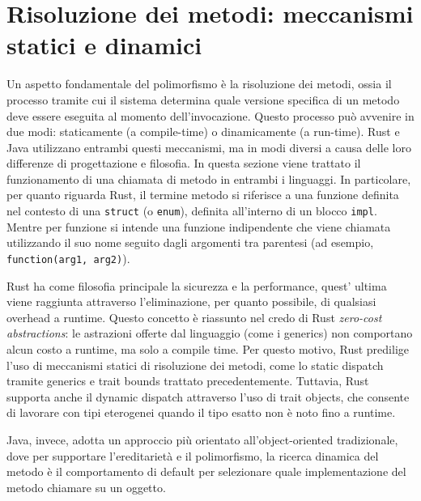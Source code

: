 \section{Risoluzione dei metodi: meccanismi statici e dinamici}
Un aspetto fondamentale del polimorfismo è la risoluzione dei metodi, ossia il processo tramite cui il sistema determina quale versione specifica di un metodo deve essere eseguita al momento dell'invocazione. Questo processo può avvenire in due modi: staticamente (a compile-time) o dinamicamente (a run-time). Rust e Java utilizzano entrambi questi meccanismi, ma in modi diversi a causa delle loro differenze di progettazione e filosofia. In questa sezione viene trattato il funzionamento di una chiamata di metodo in entrambi i linguaggi. In particolare, per quanto riguarda Rust, il termine metodo si riferisce a una funzione definita nel contesto di una \texttt{struct} (o \texttt{enum}), definita all'interno di un blocco \texttt{impl}. Mentre per funzione si intende una funzione indipendente che viene chiamata utilizzando il suo nome seguito dagli argomenti tra parentesi (ad esempio, \texttt{function(arg1, arg2)}).

Rust ha come filosofia principale la sicurezza e la performance, quest' ultima viene raggiunta attraverso l'eliminazione, per quanto possibile, di qualsiasi overhead a runtime. Questo concetto è riassunto nel credo di Rust \textit{zero-cost abstractions}: le astrazioni offerte dal linguaggio (come i generics) non comportano alcun costo a runtime, ma solo a compile time. Per questo motivo, Rust predilige l'uso di meccanismi statici di risoluzione dei metodi, come lo static dispatch tramite generics e trait bounds trattato precedentemente. Tuttavia, Rust supporta anche il dynamic dispatch attraverso l'uso di trait objects, che consente di lavorare con tipi eterogenei quando il tipo esatto non è noto fino a runtime. 

Java, invece, adotta un approccio più orientato all'object-oriented tradizionale, dove per supportare l'ereditarietà e il polimorfismo, la ricerca dinamica del metodo è il comportamento di default per selezionare quale implementazione del metodo chiamare su un oggetto.

